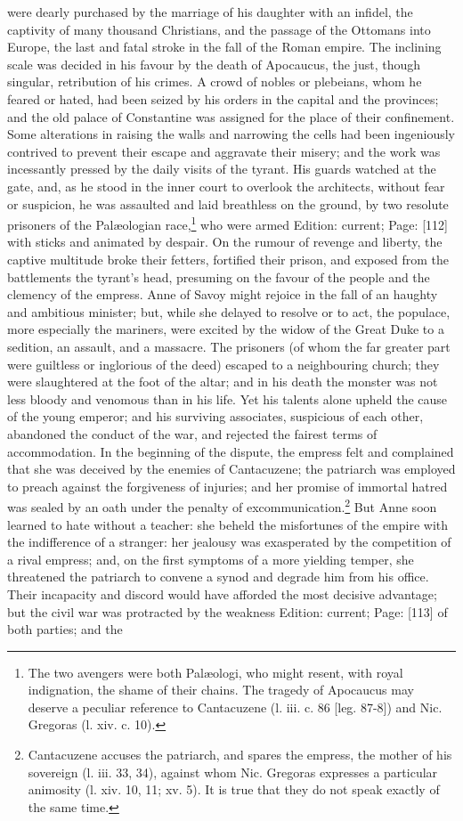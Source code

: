were dearly purchased by the marriage of his daughter with an infidel, the captivity of many thousand Christians, and the passage of the Ottomans into Europe, the last and fatal stroke in the fall of the Roman empire. The inclining scale was decided in his favour by the death of Apocaucus, the just, though singular, retribution of his crimes. A crowd of nobles or plebeians, whom he feared or hated, had been seized by his orders in the capital and the provinces; and the old palace of Constantine was assigned for the place of their confinement. Some alterations in raising the walls and narrowing the cells had been ingeniously contrived to prevent their escape and aggravate their misery; and the work was incessantly pressed by the daily visits of the tyrant. His guards watched at the gate, and, as he stood in the inner court to overlook the architects, without fear or suspicion, he was assaulted and laid breathless on the ground, by two resolute prisoners of the Palæologian race,\footnote{The two avengers were both Palæologi, who might resent, with royal indignation, the shame of their chains. The tragedy of Apocaucus may deserve a peculiar reference to Cantacuzene (l. iii. c. 86 [leg. 87-8]) and Nic. Gregoras (l. xiv. c. 10).} who were armed Edition: current; Page: [112] with sticks and animated by despair. On the rumour of revenge and liberty, the captive multitude broke their fetters, fortified their prison, and exposed from the battlements the tyrant\texthebrew{}’s head, presuming on the favour of the people and the clemency of the empress. Anne of Savoy might rejoice in the fall of an haughty and ambitious minister; but, while she delayed to resolve or to act, the populace, more especially the mariners, were excited by the widow of the Great Duke to a sedition, an assault, and a massacre. The prisoners (of whom the far greater part were guiltless or inglorious of the deed) escaped to a neighbouring church; they were slaughtered at the foot of the altar; and in his death the monster was not less bloody and venomous than in his life. Yet his talents alone upheld the cause of the young emperor; and his surviving associates, suspicious of each other, abandoned the conduct of the war, and rejected the fairest terms of accommodation. In the beginning of the dispute, the empress felt and complained that she was deceived by the enemies of Cantacuzene; the patriarch was employed to preach against the forgiveness of injuries; and her promise of immortal hatred was sealed by an oath under the penalty of excommunication.\footnote{Cantacuzene accuses the patriarch, and spares the empress, the mother of his sovereign (l. iii. 33, 34), against whom Nic. Gregoras expresses a particular animosity (l. xiv. 10, 11; xv. 5). It is true that they do not speak exactly of the same time.} But Anne soon learned to hate without a teacher: she beheld the misfortunes of the empire with the indifference of a stranger: her jealousy was exasperated by the competition of a rival empress; and, on the first symptoms of a more yielding temper, she threatened the patriarch to convene a synod and degrade him from his office. Their incapacity and discord would have afforded the most decisive advantage; but the civil war was protracted by the weakness Edition: current; Page: [113] of both parties; and the 